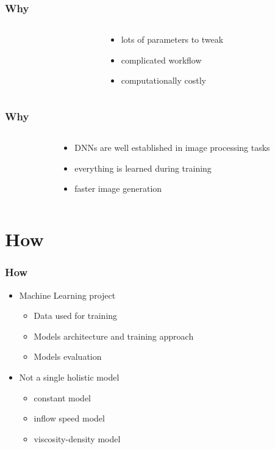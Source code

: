 \documentclass[18pt]{beamer}
\begin{document}
\begin{frame}
  \frametitle{Why}

  \begin{columns}[t]
    \begin{column}{0.5\textwidth}
      
    \end{column}
    \begin{column}{0.5\textwidth}
      \begin{itemize}
      \item lots of parameters to tweak
      \item complicated workflow
      \item computationally costly
      \end{itemize}
    \end{column}
  \end{columns}  
\end{frame}

\begin{frame}
  \frametitle{Why}

  \begin{columns}[t]
    \begin{column}{0.5\textwidth}
      
    \end{column}
    \begin{column}{0.5\textwidth}
      \begin{itemize}
      \item DNNs are well established in image processing tasks
      \item everything is learned during training
      \item faster image generation
      \end{itemize}
    \end{column}
  \end{columns}  
\end{frame}


\section{How}

\begin{frame}
  \frametitle{How}
  \begin{itemize}
  \item Machine Learning project
    \begin{itemize}
    \item Data used for training
    \item Models architecture and training approach
    \item Models evaluation
    \end{itemize}
  \item Not a single holistic model
    \begin{itemize}
    \item constant model
    \item inflow speed model
    \item viscosity-density model
    \end{itemize}
    
  \end{itemize}
\end{frame}
\end{document}

